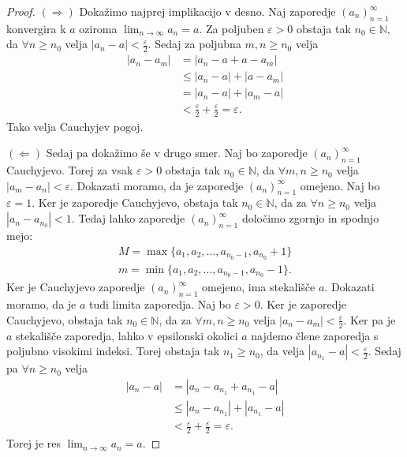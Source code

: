 \documentclass[10pt, a4paper]{article}
\newenvironment{noticeC}{%
  \tcolorbox[%
  notitle,
  empty,
  enhanced,  %
  breakable,
  coltext=black, 
  fontupper=\rmfamily,
  parbox=false,
  noparskip,
  sharp corners,
  boxrule=-1pt,  %
  frame hidden,
  left=7pt,  %
  right=7pt,
  top=5pt,
  bottom=5pt,
  before skip=2.5ex plus 2pt,
  after skip=2.5ex plus 2pt,
  overlay unbroken and last={%
  },
  ]}
{\endtcolorbox}
\newenvironment{dokaz}%
  {\begin{noticeC}\begin{proof}}%
  {\end{proof}\end{noticeC}}
\newcommand{\N}{\mathbb {N}}
\newcommand{\zap}[1]{(#1_n)_{n=1} ^{\infty}}
\newcommand{\limzap}[1]{\lim_{n \to \infty} {#1}}
\begin{document}
    \begin{dokaz}
        $(\Rightarrow)$ Dokažimo najprej implikacijo v desno. 
        Naj zaporedje $\zap{a}$ konvergira k $a$ oziroma $\limzap{a_n} = a.$ 
        Za poljuben $\varepsilon>0$ obstaja tak $n_0 \in \N$, da $\forall n \geq n_0$ velja 
        $|a_n - a|< \frac{\varepsilon}{2}.$ Sedaj za poljubna $m,n \geq n_0$ velja
        \begin{align*}
            |a_n - a_m| &= |a_n - a + a - a_m|\\
            &\leq |a_n - a| + |a- a_m|\\
            &= |a_n - a| + |a_m - a|\\
            &< \frac{\varepsilon}{2} + \frac{\varepsilon}{2} = \varepsilon.
        \end{align*}
        Tako velja Cauchyjev pogoj. 
        
        $(\Leftarrow)$ Sedaj pa dokažimo še v drugo smer. 
        Naj bo zaporedje $\zap{a}$ Cauchyjevo. 
        Torej za vsak $\varepsilon>0$ obstaja tak $n_0 \in \N$, da $\forall m,n \geq n_0$ velja
        $|a_m - a_n| < \varepsilon.$
            Dokazati moramo, da je zaporedje $\zap{a}$ omejeno. Naj bo $\varepsilon=1$. Ker je zaporedje Cauchyjevo, obstaja tak $n_0 \in \N$, da za $\forall n \geq n_0$ velja
            $|a_n -a_{n_0}| < 1.$ Tedaj lahko zaporedje $\zap{a}$ določimo zgornjo in spodnjo mejo:
            \begin{align*}
                M = \max \{a_1, a_2, \dots, a_{n_0-1}, a_{n_0}+1\}\\
                m = \min \{a_1, a_2, \dots, a_{n_0-1}, a_{n_0} - 1\}.
            \end{align*}
            Ker je Cauchyjevo zaporedje $\zap{a}$ omejeno, ima stekališče $a$. 
            Dokazati moramo, da je $a$ tudi limita zaporedja. Naj bo $\varepsilon>0$. Ker je zaporedje Cauchyjevo, obstaja tak $n_0 \in \N$, da za $\forall m,n \geq n_0$ velja
            $|a_n - a_m|< \frac{\varepsilon}{2}.$ 
            Ker pa je $a$ stekališče zaporedja, lahko v epsilonski okolici $a$ najdemo člene zaporedja s poljubno visokimi indeksi. Torej obstaja tak $n_1 \geq n_0$, da velja
            $|a_{n_1} - a| < \frac{\varepsilon}{2}.$ 
            Sedaj pa $\forall n \geq n_0$ velja
            \begin{align*}
                |a_n - a| &= |a_n - a_{n_1} + a_{n_1} - a|\\
                &\leq |a_n - a_ {n_1}| + |a_{n_1} - a|\\
                &< \frac{\varepsilon}{2} + \frac{\varepsilon}{2} = \varepsilon.
            \end{align*}
            Torej je res $\limzap{a_n} = a.$ \qedhere
    \end{dokaz}
\end{document}
